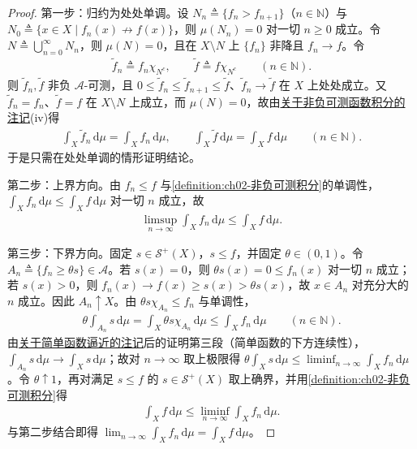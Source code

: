 \documentclass[../../main.tex]{subfiles}%
\begin{document}
\begin{proof}
第一步：归约为处处单调。设 $N_n\triangleq\{f_n>f_{n+1}\}$（$n\in\mathbb N$）与 $N_0\triangleq\{x\in X\mid f_n(x)\not\to f(x)\}$，则 $\mu(N_n)=0$ 对一切 $n\geqslant0$ 成立。令 $N\triangleq\bigcup_{n=0}^\infty N_n$，则 $\mu(N)=0$，且在 $X\setminus N$ 上 $\{f_n\}$ 非降且 $f_n\to f$。令
\begin{align*}
\tilde f_n\triangleq f_n\chi_{N^c},\qquad\tilde f\triangleq f\chi_{N^c}\qquad(n\in\mathbb N).
\end{align*}
则 $\tilde f_n,\tilde f$ 非负 $\mathscr A$-可测，且 $0\leqslant\tilde f_n\leqslant\tilde f_{n+1}\leqslant\tilde f$、$\tilde f_n\to\tilde f$ 在 $X$ 上处处成立。又 $\tilde f_n=f_n$、$\tilde f=f$ 在 $X\setminus N$ 上成立，而 $\mu(N)=0$，故由\hyperref[remark:ch02-非负可测积分动机]{关于非负可测函数积分的注记}(iv)得
\begin{align*}
\int_X\tilde f_n\,\mathrm{d}\mu=\int_Xf_n\,\mathrm{d}\mu,\qquad\int_X\tilde f\,\mathrm{d}\mu=\int_Xf\,\mathrm{d}\mu\qquad(n\in\mathbb N).
\end{align*}
于是只需在处处单调的情形证明结论。

第二步：上界方向。由 $f_n\leqslant f$ 与\cref{definition:ch02-非负可测积分}的单调性，$\int_Xf_n\,\mathrm{d}\mu\leqslant\int_Xf\,\mathrm{d}\mu$ 对一切 $n$ 成立，故
\begin{align*}
\limsup_{n\to\infty}\int_Xf_n\,\mathrm{d}\mu\leqslant\int_Xf\,\mathrm{d}\mu.
\end{align*}

第三步：下界方向。固定 $s\in\mathscr S^+(X)$，$s\leqslant f$，并固定 $\theta\in(0,1)$。令 $A_n\triangleq\{f_n\geqslant\theta s\}\in\mathscr A$。若 $s(x)=0$，则 $\theta s(x)=0\leqslant f_n(x)$ 对一切 $n$ 成立；若 $s(x)>0$，则 $f_n(x)\to f(x)\geqslant s(x)>\theta s(x)$，故 $x\in A_n$ 对充分大的 $n$ 成立。因此 $A_n\uparrow X$。由 $\theta s\chi_{A_n}\leqslant f_n$ 与单调性，
\begin{align*}
\theta\int_{A_n}s\,\mathrm{d}\mu=\int_X\theta s\chi_{A_n}\,\mathrm{d}\mu\leqslant\int_Xf_n\,\mathrm{d}\mu\qquad(n\in\mathbb N).
\end{align*}
由\hyperref[remark:ch02-简单逼近积分]{关于简单函数逼近的注记}后的证明第三段（简单函数的下方连续性），$\int_{A_n}s\,\mathrm{d}\mu\to\int_Xs\,\mathrm{d}\mu$；故对 $n\to\infty$ 取上极限得 $\theta\int_Xs\,\mathrm{d}\mu\leqslant\liminf_{n\to\infty}\int_Xf_n\,\mathrm{d}\mu$。令 $\theta\uparrow1$，再对满足 $s\leqslant f$ 的 $s\in\mathscr S^+(X)$ 取上确界，并用\cref{definition:ch02-非负可测积分}得
\begin{align*}
\int_Xf\,\mathrm{d}\mu\leqslant\liminf_{n\to\infty}\int_Xf_n\,\mathrm{d}\mu.
\end{align*}
与第二步结合即得 $\lim_{n\to\infty}\int_Xf_n\,\mathrm{d}\mu=\int_Xf\,\mathrm{d}\mu$。
\end{proof}
\end{document}
